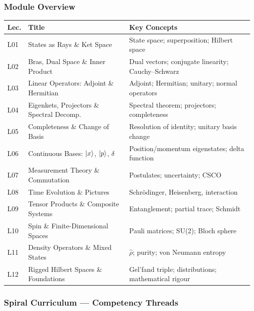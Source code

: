 \documentclass[11pt,a4paper]{article}
\begin{document}
\subsubsection*{Module Overview}

{\footnotesize
\begin{center}
\begin{tabular}{@{}lp{4.2cm}p{6.8cm}@{}}
\toprule
\textbf{Lec.} & \textbf{Title} & \textbf{Key Concepts}\\
\midrule
L01 & States as Rays \& Ket Space & State space; superposition; Hilbert space\\
L02 & Bras, Dual Space \& Inner Product & Dual vectors; conjugate linearity; Cauchy--Schwarz\\
L03 & Linear Operators: Adjoint \& Hermitian & Adjoint; Hermitian; unitary; normal operators\\
L04 & Eigenkets, Projectors \& Spectral Decomp. & Spectral theorem; projectors; completeness\\
L05 & Completeness \& Change of Basis & Resolution of identity; unitary basis change\\
L06 & Continuous Bases: $\ket{x}$, $\ket{p}$, $\delta$ & Position/momentum eigenstates; delta function\\
\midrule
L07 & Measurement Theory \& Commutation & Postulates; uncertainty; CSCO\\
L08 & Time Evolution \& Pictures & Schr\"odinger, Heisenberg, interaction\\
L09 & Tensor Products \& Composite Systems & Entanglement; partial trace; Schmidt\\
L10 & Spin \& Finite-Dimensional Spaces & Pauli matrices; SU(2); Bloch sphere\\
L11 & Density Operators \& Mixed States & $\hat\rho$; purity; von Neumann entropy\\
L12 & Rigged Hilbert Spaces \& Foundations & Gel'fand triple; distributions; mathematical rigour\\
\bottomrule
\end{tabular}
\end{center}
}

\subsubsection*{Spiral Curriculum --- Competency Threads}
\end{document}
